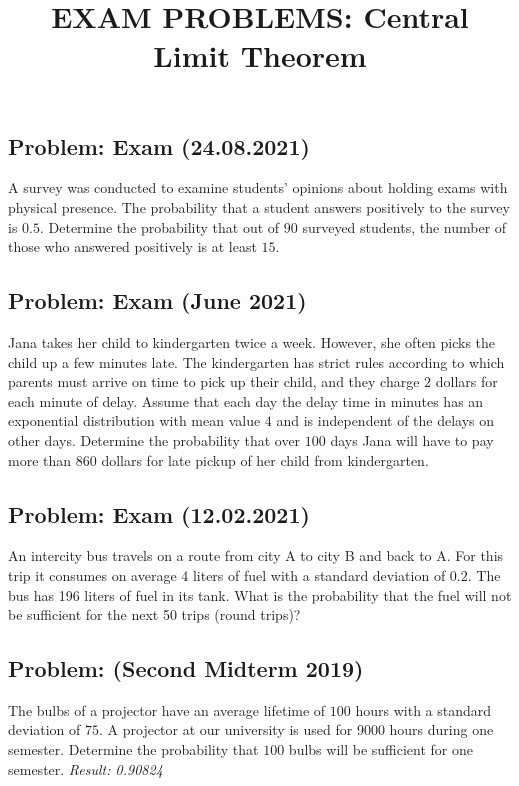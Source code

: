 \documentclass[a4paper, 12pt]{article}
\title{
  \vspace{-1.5cm}
  \textbf{EXAM PROBLEMS: Central Limit Theorem}
  \vspace{-1.5cm}
}
\date{}
\begin{document}
\maketitle

\subsection{Problem: Exam (24.08.2021)}
A survey was conducted to examine students' opinions about holding exams with physical presence. The probability that a student answers positively to the survey is $0.5$. Determine the probability that out of $90$ surveyed students, the number of those who answered positively is at least $15$.

\subsection{Problem: Exam (June 2021)}

Jana takes her child to kindergarten twice a week. However, she often picks the child up a few minutes late. The kindergarten has strict rules according to which parents must arrive on time to pick up their child, and they charge $2$ dollars for each minute of delay. Assume that each day the delay time in minutes has an exponential distribution with mean value $4$ and is independent of the delays on other days. Determine the probability that over $100$ days Jana will have to pay more than $860$ dollars for late pickup of her child from kindergarten.


\subsection{Problem: Exam (12.02.2021)}

An intercity bus travels on a route from city A to city B and back to A. For this trip it consumes on average $4$ liters of fuel with a standard deviation of $0.2$. The bus has 196 liters of fuel in its tank. What is the probability that the fuel will not be sufficient for the next 50 trips (round trips)?

\subsection{Problem: (Second Midterm 2019)}

The bulbs of a projector have an average lifetime of $100$ hours with a standard deviation of $75$. A projector at our university is used for 9000 hours during one semester. Determine the probability that $100$ bulbs will be sufficient for one semester.
\textit{Result: {0.90824}}
\end{document}
